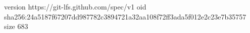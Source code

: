 version https://git-lfs.github.com/spec/v1
oid sha256:24a5187f67207dd987782c3894721a32aa108f72ff3ada5f012e2c23e7b35757
size 683
